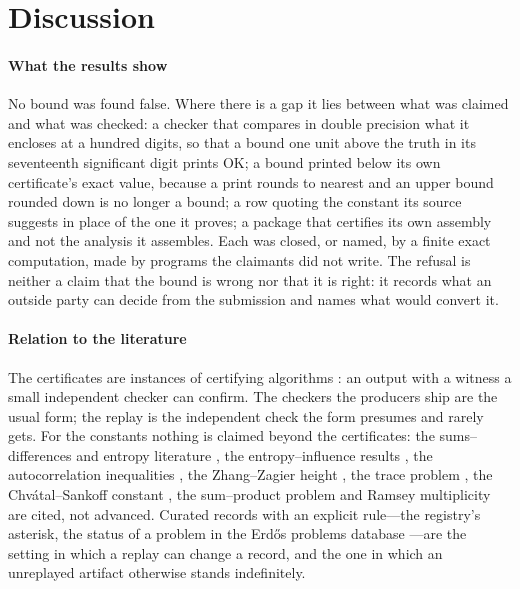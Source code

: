 \documentclass[preprint,11pt,authoryear,a4paper]{elsarticle}
\begin{document}
\section{Discussion}\label{sec:discussion}

\paragraph{What the results show} No bound was found false. Where there is a gap it lies between what was claimed and what was checked: a checker that compares in double precision what it encloses at a hundred digits, so that a bound one unit above the truth in its seventeenth significant digit prints OK; a bound printed below its own certificate's exact value, because a print rounds to nearest and an upper bound rounded down is no longer a bound; a row quoting the constant its source suggests in place of the one it proves; a package that certifies its own assembly and not the analysis it assembles. Each was closed, or named, by a finite exact computation, made by programs the claimants did not write. The refusal is neither a claim that the bound is wrong nor that it is right: it records what an outside party can decide from the submission and names what would convert it.

\paragraph{Relation to the literature} The certificates are instances of certifying algorithms \citep{McConnell11}: an output with a witness a small independent checker can confirm. The checkers the producers ship are the usual form; the replay is the independent check the form presumes and rarely gets. For the constants nothing is claimed beyond the certificates: the sums--differences and entropy literature \citep{KatzTao99,Lemm15,LauNair23}, the entropy--influence results \citep{FriedgutKalai96,ODonnellTan13,Hod17,KKLMS20}, the autocorrelation inequalities \citep{MatolcsiVinuesa10,CloningerSteinerberger17,BarnardSteinerberger20}, the Zhang--Zagier height \citep{Zhang92,Zagier93,Doche00}, the trace problem \citep{Smyth84,Smith24,OrloskiSardari23}, the Chv\'atal--Sankoff constant \citep{ChvatalSankoff75,Lueker09}, the sum--product problem \citep{ErdosSzemeredi83} and Ramsey multiplicity \citep{Thomason89,PPSS22} are cited, not advanced. Curated records with an explicit rule---the registry's asterisk, the status of a problem in the Erd\H{o}s problems database \citep{ErdosProblems}---are the setting in which a replay can change a record, and the one in which an unreplayed artifact otherwise stands indefinitely.
\end{document}

